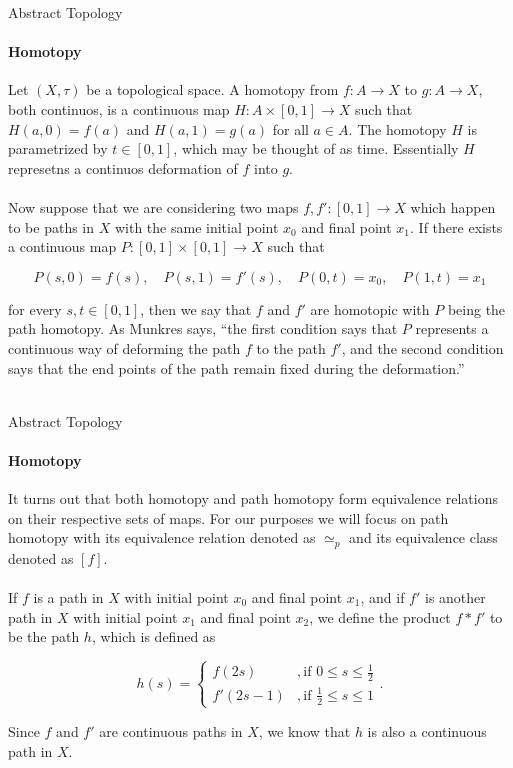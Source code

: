 \documentclass[pdf]{beamer}
\begin{document}
    \begin{frame}{Abstract Topology}
        \framesubtitle{Homotopy}

        Let $(X, \tau)$ be a topological space. A {\color{red} homotopy} from $f: A \to X$ to $g: A \to X$,
        both continuos, is a continuous map $H: A \times [0, 1] \to X$ such that $H(a, 0)
        = f(a)$ and $H(a, 1) = g(a)$ for all $a \in A$. The homotopy $H$ is parametrized by 
        $t \in [0, 1]$, which may be thought of as time. Essentially $H$ represetns a continuos
        deformation of $f$ into $g$. \\~\\

        Now suppose that we are considering two maps $f, f': [0, 1] \to X$ which happen
        to be paths in $X$ with the same initial point $x_0$ and final point $x_1$.
        If there exists a continuous map $P: [0, 1] \times [0, 1] \to X$ such that 

        $$
            P(s, 0) = f(s), \quad P(s, 1) = f'(s), \quad P(0, t) = x_0, \quad P(1, t) = x_1 \nonumber
        $$

        for every $s, t \in [0, 1]$, then we say that $f$ and $f'$ are {\color{red} homotopic}
        with $P$ being the {\color{red} path homotopy}. As Munkres says, ``the first condition
        says that $P$ represents a continuous way of deforming the path $f$ to the path
        $f'$, and the second condition says that the end points of the path remain fixed
        during the deformation.'' \\~\\

    \end{frame}

    \begin{frame}{Abstract Topology}
        \framesubtitle{Homotopy}

        It turns out that both homotopy and path homotopy form equivalence relations on their 
        respective sets of maps. For our purposes we will focus on path homotopy with its 
        equivalence relation denoted as $\simeq_p$ and its equivalence class denoted as $[f]$. \\~\\

        If $f$ is a path in $X$ with initial point $x_0$ and final point $x_1$, and if $f'$
        is another path in $X$ with initial point $x_1$ and final point $x_2$, we define the
        {\color{red} product} $f * f'$ to be the path $h$, which is defined  as

        $$h(s) =
        \begin{cases}
            f(2s) &, \text{if } 0 \leq s \leq \frac{1}{2} \\
            f'(2s - 1) &, \text{if } \frac{1}{2} \leq s \leq 1
        \end{cases}.
        $$

        Since $f$ and $f'$ are continuous paths in $X$, we know that $h$ is also a continuous path in $X$. \\~\\

    \end{frame}
\end{document}
